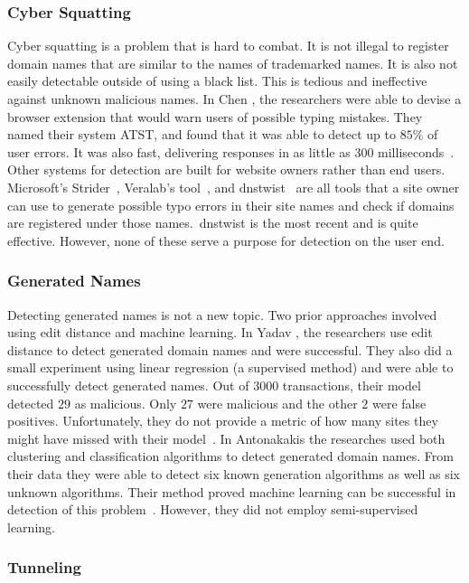\subsubsection{Cyber Squatting}

Cyber squatting is a problem that is hard to combat.
It is not illegal to register domain names that are similar to the names of trademarked names.
It is also not easily detectable outside of using a black list.
This is tedious and ineffective against unknown malicious names.
In Chen \etal{}, the researchers were able to devise a browser extension that would warn users of
possible typing mistakes.
They named their system ATST, and found that it was able to detect up to $85\%$ of user errors.
It was also fast, delivering responses in as little as $300$ milliseconds~\cite{squat}.
Other systems for detection are built for website owners rather than end users.
Microsoft's Strider~\cite{strider}, Veralab's tool~\cite{veralab}, and dnstwist~\cite{elceef} are
all tools that a site owner can use to generate possible typo errors in their site names and check
if domains are registered under those names.\
dnstwist is the most recent and is quite effective.
However, none of these serve a purpose for detection on the user end.

\subsubsection{Generated Names}

Detecting generated names is not a new topic.
Two prior approaches involved using edit distance and machine learning.
In Yadav \etal{}, the researchers use edit distance to detect generated domain names and were
successful.
They also did a small experiment using linear regression (a supervised method) and were able to
successfully detect generated names.
Out of $3000$ transactions, their model detected $29$ as malicious.
Only $27$ were malicious and the other $2$ were false positives.
Unfortunately, they do not provide a metric of how many sites they might have missed with their
model~\cite{algorithm}.
In Antonakakis \etal{} the researches used both clustering and classification algorithms to
detect generated domain names.
From their data they were able to detect six known generation algorithms as well as six unknown
algorithms.
Their method proved machine learning can be successful in detection of this problem~\cite{usenix}.
However, they did not employ semi-supervised learning.

\subsubsection{Tunneling}

